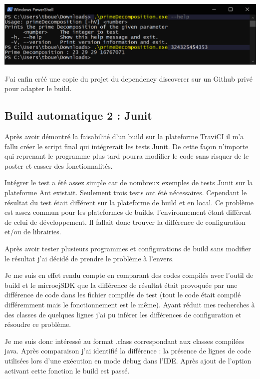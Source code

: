 \documentclass[french,a4paper,12pt]{report}
\begin{document}
\begin{center}
  \includegraphics[width=\textwidth]{ressources/images/exePrime.png}
\end{center}

J'ai enfin créé une copie du projet du dependency discoverer sur un Github privé pour adapter le build.

\subsection{Build automatique 2 : Junit}

Après avoir démontré la faisabilité d’un build sur la plateforme TraviCI il m’a fallu créer le script final qui intégrerait les tests Junit. De cette façon n’importe qui reprenant le programme plus tard pourra modifier le code sans risquer de le poster et casser des fonctionnalités.

Intégrer le test a été assez simple car de nombreux exemples de tests Junit sur la plateforme Ant existait. Seulement trois tests ont été nécessaires. Cependant le résultat du test était différent sur la plateforme de build et en local. Ce problème est assez commun pour les plateformes de builds, l’environnement étant différent de celui de développement. Il fallait donc trouver la différence de configuration et/ou de librairies.

Après avoir tester plusieurs programmes et configurations de build sans modifier le résultat j’ai décidé de prendre le problème à l’envers.

Je me suis en effet rendu compte en comparant des codes compilés avec l’outil de build et le microejSDK que la différence de résultat était provoquée par une différence de code dans les fichier compilés de test (tout le code était compilé différemment mais le fonctionnement est le même). Ayant réduit mes recherches à des classes de quelques lignes j’ai pu inférer les différences de configuration et résoudre ce problème.

Je me suis donc intéressé au format .class correspondant aux classes compilées java. 
Après comparaison j’ai identifié la différence : la présence de lignes de code utilisées lors d'une exécution en mode debug dans l’IDE. Après ajout de l’option activant cette fonction le build est passé.
\end{document}
